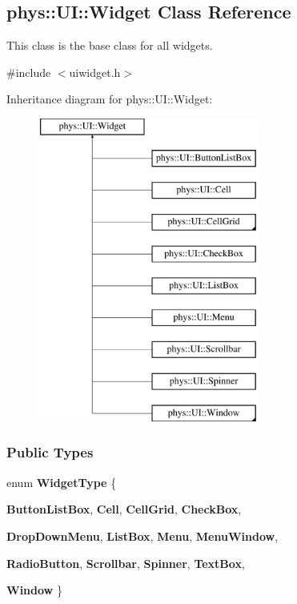 \hypertarget{classphys_1_1UI_1_1Widget}{
\subsection{phys::UI::Widget Class Reference}
\label{d9/d48/classphys_1_1UI_1_1Widget}
}


This class is the base class for all widgets.  




{\ttfamily \#include $<$uiwidget.h$>$}

Inheritance diagram for phys::UI::Widget:\begin{figure}[H]
\begin{center}
\leavevmode
\includegraphics[height=10.000000cm]{d9/d48/classphys_1_1UI_1_1Widget}
\end{center}
\end{figure}
\subsubsection*{Public Types}
\begin{DoxyCompactItemize}
\item 
enum {\bfseries WidgetType} \{ \par
{\bfseries ButtonListBox}, 
{\bfseries Cell}, 
{\bfseries CellGrid}, 
{\bfseries CheckBox}, 
\par
{\bfseries DropDownMenu}, 
{\bfseries ListBox}, 
{\bfseries Menu}, 
{\bfseries MenuWindow}, 
\par
{\bfseries RadioButton}, 
{\bfseries Scrollbar}, 
{\bfseries Spinner}, 
{\bfseries TextBox}, 
\par
{\bfseries Window}
 \}
\end{DoxyCompactItemize}
